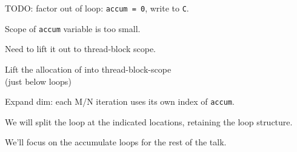 {\LARGE
TODO: factor out of  loop: \texttt{accum = 0}, write to \texttt{C}.

}


\newpage
{}

{\large

}

{\LARGE
Scope of \texttt{accum} variable is too small.

Need to lift it out to thread-block scope.

}

\newpage
{}

{\large

}

{\LARGE
Lift the allocation of  into thread-block-scope\\
(just below  loops)
}

\newpage
{}

{\large

}

{\LARGE
Expand dim: each M/N iteration uses its own index of \texttt{accum}.
}

\newpage
{}

{\large

}

{\LARGE
We will split the loop at the indicated locations, retaining the loop structure.
}

\newpage
{\large

}

\newpage
{}

{\large

}

{\LARGE
We'll focus on the accumulate loops for the rest of the talk.

}

\newpage
{}

{\large

}


\begin{center}
\Large
\begin{tikzpicture}[node distance=0mm]

\end{tikzpicture}
\end{center}

